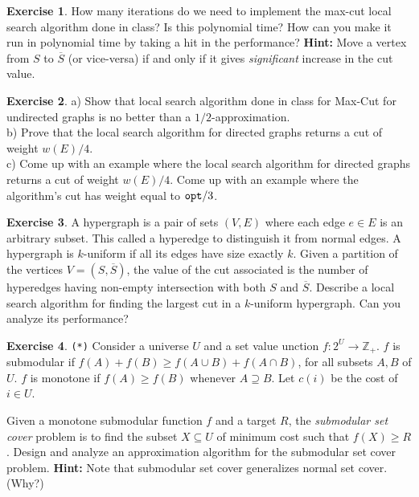 \documentclass[11pt]{article}
\theoremstyle{definition}
\newtheorem{exercise}{Exercise}
\def\bar{\overline}
\def\opt{{\tt opt}}
\begin{document}
\begin{exercise}
How many iterations do we need to implement the max-cut local search algorithm done in class?
Is this polynomial time? How can you make it run in polynomial time by taking a hit in the performance?
{\bf Hint:} Move a vertex from $S$ to $\bar{S}$ (or vice-versa) if and only if it gives {\em significant}
increase in the cut value.
\end{exercise}
\vspace{1ex}

\begin{exercise}
a) Show that local search algorithm done in class for Max-Cut for undirected graphs
is no better than a $1/2$-approximation.  \\

\noindent
b) Prove that the local search algorithm for directed graphs returns a 
cut of weight $w(E)/4$.  \\

\noindent
c) Come up with an example where the 
local search algorithm for directed graphs returns a cut of weight $w(E)/4$. 
Come up with an example where the algorithm's cut has weight equal to $\opt/3$.
\end{exercise}
\vspace{1ex}

\begin{exercise}
A hypergraph is a pair of sets $(V,E)$ where each edge $e\in E$ is an arbitrary subset. 
This called a hyperedge to distinguish it from normal edges. A hypergraph is $k$-uniform if
all its edges have size exactly $k$. Given a partition of the vertices $V = (S,\bar{S})$, the value of the cut associated is the number of hyperedges having non-empty intersection with both $S$ and $\bar{S}$. Describe a local search algorithm for finding the largest cut in a $k$-uniform hypergraph. Can you analyze its performance?
\end{exercise}
\vspace{2ex}
\def\near{{\tt nearest}}
\def\bad{{\tt bad}}
\def\Far{{\tt Far}}
\def\friend{{\tt friend}}

\vspace{1ex}
\begin{exercise} {{\tt (*)}}
Consider a universe $U$ and a set value unction $f:2^U \to {\mathbb Z}_+$. $f$ is submodular
if $f(A) + f(B)\ge f(A\cup B) + f(A\cap B)$, for all subsets $A,B$ of $U$. $f$ is monotone if 
$f(A) \ge f(B)$ whenever $A \supseteq B$. Let $c(i)$ be the cost of  $i\in U$. 

Given a monotone submodular function $f$ and a target $R$, the {\em submodular set cover} problem is to find the subset $X\subseteq U$ of minimum cost such that $f(X) \ge R$. Design and analyze an approximation algorithm for the submodular set cover problem. {\bf Hint:} Note that submodular set cover generalizes normal set cover. (Why?)
\end{exercise}
\vspace{1ex}
\end{document}
